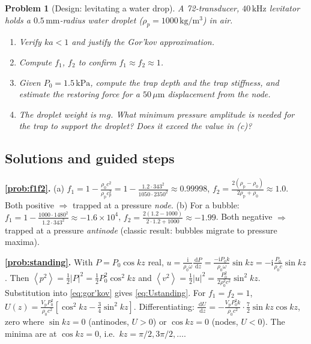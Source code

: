 \documentclass[11pt]{article}
\newtheorem{problem}{Problem}[section]
\newcommand{\pp}{\rho_{\mathrm{p}}}
\newcommand{\rrho}{\rho_{0}}
\newcommand{\vp}{V_{\mathrm{p}}}
\newcommand{\avg}[1]{\left\langle #1 \right\rangle}
\newcommand{\vpSq}{\avg{p^{2}}}
\newcommand{\vvSq}{\avg{v^{2}}}
\newcommand{\dd}{\,\mathrm{d}}
\newcommand{\ii}{\mathrm{i}}
\begin{document}
\begin{problem}[Design: levitating a water drop]\label{prob:design}
A 72-transducer, $40\,\mathrm{kHz}$ levitator holds a $0.5\,\mathrm{mm}$-radius
water droplet ($\rho_p=1000\,\mathrm{kg/m^3}$) in air.
\begin{enumerate}[label=(\alph*)]
  \item Verify $ka<1$ and justify the Gor'kov approximation.
  \item Compute $f_1$, $f_2$ to confirm $f_1\approx f_2\approx1$.
  \item Given $P_0=1.5\,\mathrm{kPa}$, compute the trap depth and the trap
  stiffness, and estimate the restoring force for a $50\,\mu\mathrm{m}$
  displacement from the node.
  \item The droplet weight is $m g$. What minimum pressure amplitude is needed
  for the trap to support the droplet? Does it exceed the value in (c)?
\end{enumerate}
\end{problem}

\subsection*{Solutions and guided steps}

\textbf{\ref{prob:f1f2}.} (a)
$f_1=1-\frac{\rrho c^2}{\pp c_p^2}=1-\frac{1.2\cdot343^2}{1050\cdot2350^2}\approx0.99998$,
$f_2=\frac{2(\pp-\rrho)}{2\pp+\rrho}\approx1.0$. Both positive $\Rightarrow$
trapped at a pressure \emph{node}. (b) For a bubble:
$f_1=1-\frac{1000\cdot1480^2}{1.2\cdot343^2}\approx-1.6\times10^4$,
$f_2=\frac{2(1.2-1000)}{2\cdot1.2+1000}\approx-1.99$. Both negative
$\Rightarrow$ trapped at a pressure \emph{antinode} (classic result: bubbles
migrate to pressure maxima).

\textbf{\ref{prob:standing}.} With $P=P_0\cos kz$ real,
$u=\frac{\ii}{\rrho\omega}\frac{\dd P}{\dd z}=\frac{-\ii P_0 k}{\rrho\omega}\sin kz
=-\ii\frac{P_0}{\rrho c}\sin kz$. Then
$\vpSq=\tfrac12|P|^2=\tfrac12P_0^2\cos^2 kz$ and
$\vvSq=\tfrac12|u|^2=\frac{P_0^2}{2\rrho^2c^2}\sin^2 kz$. Substitution into
\eqref{eq:gor'kov} gives \eqref{eq:Ustanding}. For $f_1=f_2=1$,
$U(z)=\frac{\vp P_0^2}{\rrho c^2}\left[\cos^2 kz-\frac34\sin^2 kz\right]$.
Differentiating:
$\frac{\dd U}{\dd z}=-\frac{\vp P_0^2 k}{\rrho c^2}\cdot\frac72\sin kz\cos kz$,
zero where $\sin kz=0$ (antinodes, $U>0$) or $\cos kz=0$ (nodes, $U<0$). The
minima are at $\cos kz=0$, i.e.\ $kz=\pi/2,3\pi/2,\dots$.
\end{document}
